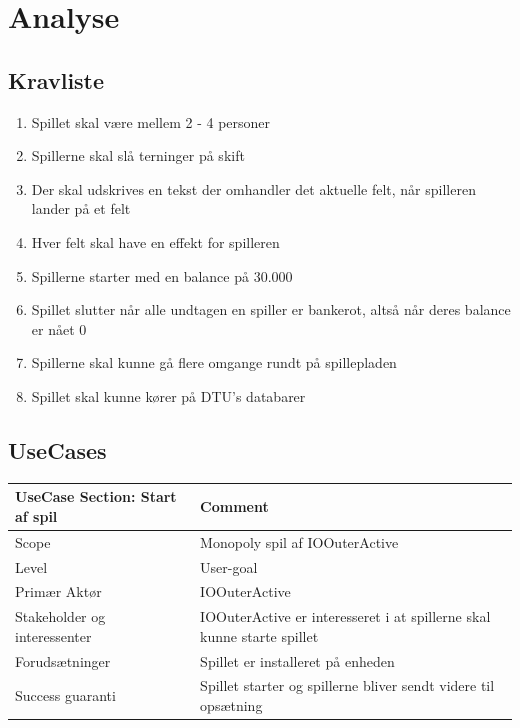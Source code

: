 \section{Analyse}
\subsection{Kravliste}
\begin{enumerate}
\item Spillet skal være mellem 2 - 4 personer
\item Spillerne skal slå terninger på skift
\item Der skal udskrives en tekst der omhandler det aktuelle felt, når spilleren lander på et felt
\item Hver felt skal have en effekt for spilleren
\item Spillerne starter med en balance på 30.000
\item Spillet slutter når alle undtagen en spiller er bankerot, altså når deres balance er nået 0
\item Spillerne skal kunne gå flere omgange rundt på spillepladen
\item Spillet skal kunne kører på DTU’s databarer
\end{enumerate}


\subsection{UseCases}
\begin{center}
    \begin{tabular}{ | m{10em} | m{10cm}| }
        \hline
            UseCase Section: Start af spil & Comment\\
        \hline
            Scope & Monopoly spil af IOOuterActive\\
        \hline
            Level & User-goal\\
        \hline
            Primær Aktør & IOOuterActive\\
        \hline
            Stakeholder og interessenter
            & IOOuterActive er interesseret i at spillerne skal kunne starte spillet\\
        \hline
            Forudsætninger & Spillet er installeret på enheden\\
        \hline
            Success guaranti & Spillet starter og spillerne bliver sendt videre til opsætning\\
        \hline
    \end{tabular}
\end{center}

